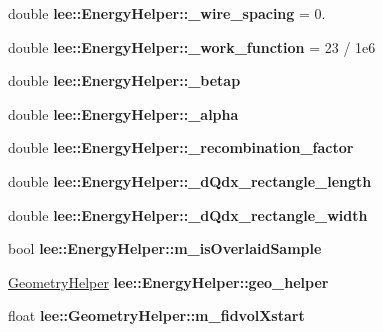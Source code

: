\begin{DoxyCompactItemize}
\item 
\hypertarget{group__lee_ga412905c2b45aa8103823f84f7bd7ea2a}{double {\bfseries lee\-::\-Energy\-Helper\-::\-\_\-wire\-\_\-spacing} = 0.}\label{group__lee_ga412905c2b45aa8103823f84f7bd7ea2a}

\item 
\hypertarget{group__lee_gafed9eac818bc9ab7f0c0cd3c808feeea}{double {\bfseries lee\-::\-Energy\-Helper\-::\-\_\-work\-\_\-function} = 23 / 1e6}\label{group__lee_gafed9eac818bc9ab7f0c0cd3c808feeea}

\item 
\hypertarget{group__lee_ga6fa094a0561f3185ae9be3cd668a64fb}{double {\bfseries lee\-::\-Energy\-Helper\-::\-\_\-betap}}\label{group__lee_ga6fa094a0561f3185ae9be3cd668a64fb}

\item 
\hypertarget{group__lee_gac748df10e62e8969fd39c85a6c4e1e95}{double {\bfseries lee\-::\-Energy\-Helper\-::\-\_\-alpha}}\label{group__lee_gac748df10e62e8969fd39c85a6c4e1e95}

\item 
\hypertarget{group__lee_gafbe2338334b0bb800473d29350d866d1}{double {\bfseries lee\-::\-Energy\-Helper\-::\-\_\-recombination\-\_\-factor}}\label{group__lee_gafbe2338334b0bb800473d29350d866d1}

\item 
\hypertarget{group__lee_gaffce1a06abee9651a41c454aa5f9032f}{double {\bfseries lee\-::\-Energy\-Helper\-::\-\_\-d\-Qdx\-\_\-rectangle\-\_\-length}}\label{group__lee_gaffce1a06abee9651a41c454aa5f9032f}

\item 
\hypertarget{group__lee_ga227149dafb056c355057c753ac768b13}{double {\bfseries lee\-::\-Energy\-Helper\-::\-\_\-d\-Qdx\-\_\-rectangle\-\_\-width}}\label{group__lee_ga227149dafb056c355057c753ac768b13}

\item 
\hypertarget{group__lee_gaece8ac78e6116f08de723bbc87d33bf9}{bool {\bfseries lee\-::\-Energy\-Helper\-::m\-\_\-is\-Overlaid\-Sample}}\label{group__lee_gaece8ac78e6116f08de723bbc87d33bf9}

\item 
\hypertarget{group__lee_ga613fe58326a28695ad83ddd7bdf8ff57}{\hyperlink{classGeometryHelper}{Geometry\-Helper} {\bfseries lee\-::\-Energy\-Helper\-::geo\-\_\-helper}}\label{group__lee_ga613fe58326a28695ad83ddd7bdf8ff57}

\item 
\hypertarget{group__lee_gaf555c24c00c66fa78b480b72633678b3}{float {\bfseries lee\-::\-Geometry\-Helper\-::m\-\_\-fidvol\-Xstart}}\label{group__lee_gaf555c24c00c66fa78b480b72633678b3}


\end{DoxyCompactItemize}
